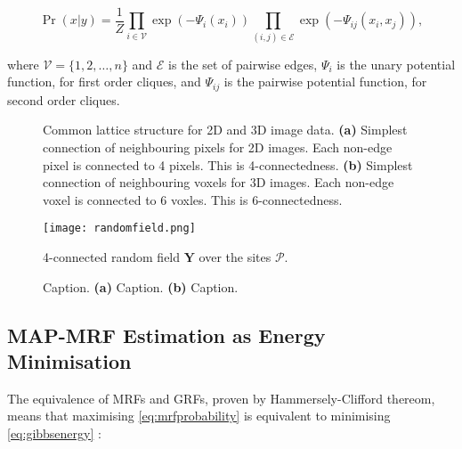 \begin{equation}
\Pr(x|y) = \frac{1}{Z}\prod_{i \in \mathcal{V}}\exp(-\Psi_i(x_i))\prod_{(i,j) \in \mathcal{E}}\exp(-\Psi_{ij}(x_i,x_j)),
\label{eq:gibbs2}
\end{equation}

where $\mathcal{V} = \{1,2,\ldots,n\}$ and $\mathcal{E}$ is the set of pairwise edges, $\Psi_i$ is the unary potential function, for first order cliques, and $\Psi_{ij}$ is the pairwise potential function, for second order cliques.

\begin{figure}[!t]
	\centering
	\caption{Common lattice structure for 2D and 3D image data. 
	\textbf{(a)} Simplest connection of neighbouring pixels for 2D images. Each non-edge pixel is connected to 4 pixels. This is 4-connectedness.
	\textbf{(b)} Simplest connection of neighbouring voxels for 3D images. Each non-edge voxel is connected to 6 voxles. This is 6-connectedness.}
	\label{fig:connectedness}
\end{figure}

\begin{figure}[!t]
	\centering
	\texttt{[image: randomfield.png]}
	\caption{4-connected random field $\mathbf{Y}$ over the sites $\mathcal{P}$.}
	\label{fig:randomfield}
\end{figure}

\begin{figure}[!t]
	\centering
	\caption{Caption. \textbf{(a)} Caption. \textbf{(b)} Caption.}
	\label{fig:cliques}
\end{figure}


\subsection{MAP-MRF Estimation as Energy Minimisation}
\label{sec:MAPMRFEstimation}

The equivalence of MRFs and GRFs, proven by Hammersely-Clifford thereom, means that maximising \autoref{eq:mrfprobability} is equivalent to minimising \autoref{eq:gibbsenergy} \citep{Winkler2006}:

